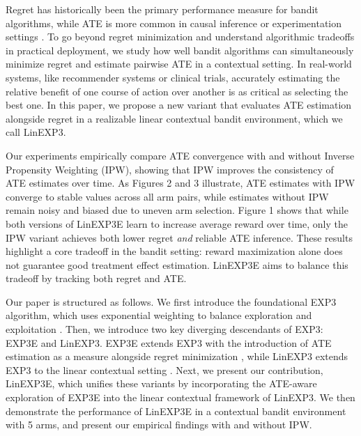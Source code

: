 Regret has historically been the primary performance measure for bandit algorithms, while ATE is more common in causal inference or experimentation settings \citep{lattimore2020bandit}. To go beyond regret minimization and understand algorithmic tradeoffs in practical deployment, we study how well bandit algorithms can simultaneously minimize regret and estimate pairwise ATE in a contextual setting. In real-world systems, like recommender systems or clinical trials, accurately estimating the relative benefit of one course of action over another is as critical as selecting the best one. In this paper, we propose a new variant that evaluates ATE estimation alongside regret in a realizable linear contextual bandit environment, which we call LinEXP3.

Our experiments empirically compare ATE convergence with and without Inverse Propensity Weighting (IPW), showing that IPW improves the consistency of ATE estimates over time. As Figures 2 and 3 illustrate, ATE estimates with IPW converge to stable values across all arm pairs, while estimates without IPW remain noisy and biased due to uneven arm selection. Figure 1 shows that while both versions of LinEXP3E learn to increase average reward over time, only the IPW variant achieves both lower regret \textit{and} reliable ATE inference. These results highlight a core tradeoff in the bandit setting: reward maximization alone does not guarantee good treatment effect estimation. LinEXP3E aims to balance this tradeoff by tracking both regret and ATE.

Our paper is structured as follows. We first introduce the foundational EXP3 algorithm, which uses exponential weighting to balance exploration and exploitation \citep{auer2002exp3}. Then, we introduce two key diverging descendants of EXP3: EXP3E and LinEXP3. EXP3E extends EXP3 with the introduction of ATE estimation as a measure alongside regret minimization \citep{simchilevi2023adaptive}, while LinEXP3 extends EXP3 to the linear contextual setting \citep{neu2020linear}. Next, we present our contribution, LinEXP3E, which unifies these variants by incorporating the ATE-aware exploration of EXP3E into the linear contextual framework of LinEXP3. We then demonstrate the performance of LinEXP3E in a contextual bandit environment with 5 arms, and present our empirical findings with and without IPW.
